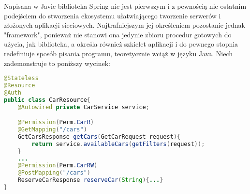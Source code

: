 Napisana w Javie biblioteka Spring nie jest pierwszym i z pewnością nie ostatnim podejściem do stworzenia ekosystemu ułatwiającego tworzenie serwerów i złożonych aplikacji sieciowych. Najtrafniejszym jej określeniem pozostanie jednak "framework", ponieważ nie stanowi ona jedynie zbioru procedur gotowych do użycia, jak biblioteka, a określa również szkielet aplikacji i do pewnego stopnia redefiniuje sposób pisania programu, teoretycznie wciąż w języku Java. Niech zademonstruje to poniższy wycinek:
\begin{lstlisting}[language=java]
@Stateless
@Resource
@Auth
public class CarResource{
    @Autowired private CarService service;

    @Permission(Perm.CarR)
    @GetMapping("/cars")
    GetCarsResponse getCars(GetCarRequest request){
        return service.availableCars(getFilters(request));
    }
    ...
    @Permission(Perm.CarRW)
    @PostMapping("/cars")
    ReserveCarResponse reserveCar(String){...}
}
\end{lstlisting}

